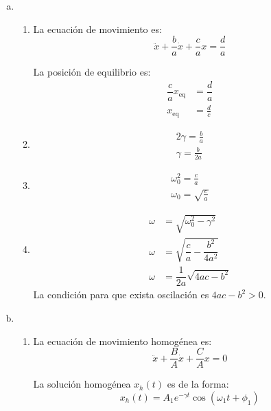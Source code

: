 \begin{enumerate}[a)]
	\item
	\begin{enumerate}
		\item La ecuación de movimiento es:
		\begin{equation*}
			\ddot{x} + \dfrac{b}{a} \dot{x} + \dfrac{c}{a} x = \dfrac{d}{a}
		\end{equation*}
		
		La posición de equilibrio es:
		\begin{align*}
			\dfrac{c}{a} x_{\text{eq}} &= \dfrac{d}{a} \\
			x_{\text{eq}} &= \frac{d}{c}
		\end{align*}
	
		\item 
		\begin{align*}
			2 \gamma = \frac{b}{a} \\
			\gamma = \frac{b}{2a}
		\end{align*}
	
		\item
		\begin{align*}
			\omega_0^2 = \frac{c}{a} \\
			\omega_0 = \sqrt{\frac{c}{a}}
		\end{align*}
	
		\item
		\begin{align*}
			\omega &= \sqrt{ \omega_0^2 - \gamma^2 } \\
			\omega &= \sqrt{ \dfrac{c}{a} - \dfrac{b^2}{4a^2} } \\
			\omega &= \dfrac{1}{2a} \sqrt{ 4ac - b^2}
		\end{align*}
		La condición para que exista oscilación es $4ac - b^2 > 0$.		
	\end{enumerate}

	\item
	\begin{enumerate}
		\item La ecuación de movimiento homogénea es:
		\begin{equation*}
			\ddot{x} + \dfrac{B}{A} \dot{x} + \dfrac{C}{A} x = 0
		\end{equation*}
		
		La solución homogénea $x_h(t)$ es de la forma:
		\begin{equation*}
			x_h(t) = A_1 e^{-\gamma t} \cos \left( \omega_1 t + \phi_1 \right)
		\end{equation*}
		

\end{enumerate}
\end{enumerate}
